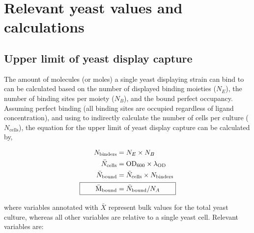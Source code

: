 \documentclass[../main/main]{subfiles}
\begin{document}
\chapter{Relevant yeast values and calculations}
\label{appendixA}

\section{Upper limit of yeast display capture}
\label{section:yeast-display-capture}
The amount of molecules (or moles) a single yeast displaying strain can bind to can be calculated based on the number of displayed binding moieties ($N_E$), the number of binding sites per moiety ($N_B$), and the bound perfect occupancy. Assuming perfect binding (all binding sites are occupied regardless of ligand concentration), and using \OD{} to indirectly calculate the number of cells per culture ($N_{\text{cells}}$), the equation for the upper limit of yeast display capture can be calculated by,

\vspace{-\baselineskip}
\begin{align}
	N_{\text{binders}} &= N_E \times N_B
		\tagaddtext{[\si{\#\per\liter}]} \\
	\bar N_{\text{cells}} &= \text{OD}_{600} \times \lambda_{\text{OD}}
		\tagaddtext{[\si{cells}]} \\
	\bar N_{\text{bound}} &= \bar N_{\text{cells}} \times N_{\text{binders}}
		\tagaddtext{[\si{\#/L}]} \\
	\Aboxed{\qquad
	\bar{\text{M}}_{\text{bound}} &= \bar{N}_{\text{bound}} / N_A
		\tagaddtext{[\si{M}]}
	\qquad}
\end{align}

where variables annotated with $\bar X$ represent bulk values for the total yeast culture, whereas all other variables are relative to a single yeast cell. Relevant variables are:
\end{document}
